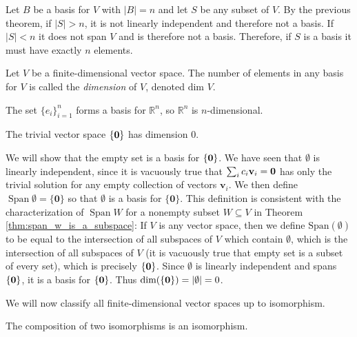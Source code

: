 \documentclass[12pt,letterpaper,reqno]{article}
\numberwithin{equation}{section}
\newcommand{\bv}{\mathbf{v}}
\DeclareMathOperator{\Span}{Span}
\begin{document}
\begin{pf}
	Let $B$ be a basis for $V$ with $|B|=n$ and let $S$ be any subset of $V$. By the previous theorem, if $|S|>n$, it is not linearly independent and therefore not a basis. If $|S|<n$ it does not span $V$ and is therefore not a basis. Therefore, if $S$ is a basis it must have exactly $n$ elements.
\end{pf}

\begin{defn}
	Let $V$ be a finite-dimensional vector space. The number of elements in any basis for $V$ is called the \emph{dimension} of $V$, denoted $\text{dim } V$.
\end{defn}

\begin{example}
	The set $\{e_i\}_{i=1}^n$ forms a basis for $\mathbb{R}^n$, so $\mathbb{R}^n$ is $n$-dimensional.
\end{example}

\begin{prop}\label{prop:trivial_vector_space}
The trivial vector space $\{{\bf 0}\}$ has dimension $0$.
\end{prop}

\begin{pf}
	We will show that the empty set is a basis for $\{{\bf 0}\}$. We have seen that $\emptyset$ is linearly independent, since it is vacuously true that $\sum_{i}c_i\bv_i={\bf 0}$ has only the trivial solution for any empty collection of vectors $\bv_i$. We then define $\Span \emptyset=\{\mathbf{0}\}$ so that $\emptyset$ is a basis for $\{\mathbf{0}\}$. This definition is consistent with the characterization of $\Span W$ for a nonempty subset $W \subseteq V$ in Theorem \ref{thm:span_w_is_a_subspace}: If $V$ is any vector space, then we define $\text{Span}(\emptyset)$ to be equal to the intersection of all subspaces of $V$ which contain $\emptyset$, which is the intersection of all subspaces of $V$ (it is vacuously true that empty set is a subset of every set), which is precisely $\{{\bf 0}\}$. Since $\emptyset$ is linearly independent and spans $\{{\bf 0}\}$, it is a basis for $\{{\bf 0}\}$. Thus $\text{dim}(\{{\bf 0}\})=|\emptyset|=0$.
\end{pf}

We will now classify all finite-dimensional vector spaces up to isomorphism.

\begin{lem}
	The composition of two isomorphisms is an isomorphism.
\end{lem}
\end{document}
